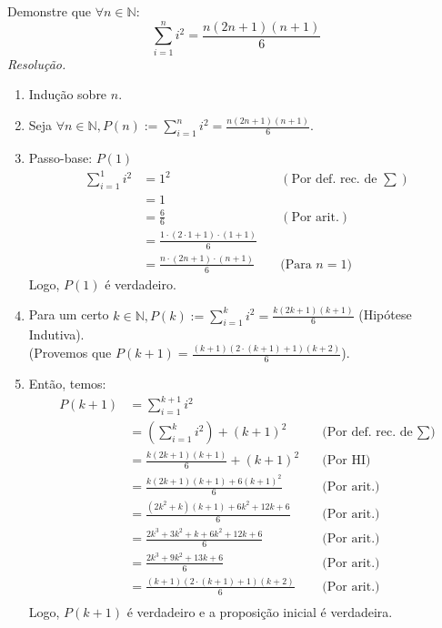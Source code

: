 Demonstre que $\forall n \in \mathbb{N}$:
\begin{displaymath}
	\sum\limits_{i=1}^n i^2 = \frac{n (2n+1) (n+1)}{6}
\end{displaymath}
\emph{Resolução.} 
\begin{enumerate}
	\item Indução sobre $n$.
	\item Seja $\forall n \in \mathbb{N}, P(n) := \sum\limits_{i=1}^n i^2 = \frac{n (2n+1) (n+1)}{6}$.
	\item Passo-base: $P(1)$
	\begin{align*}
		\sum\limits_{i=1}^1 i^2 &= 1^2 &\quad(\text{Por def. rec. de $\sum$}) \\
		&= 1 \\
		&= \frac{6}{6} &\quad(\text{Por arit.}) \\
		&= \frac{1 \cdot (2 \cdot 1 + 1) \cdot (1 + 1)}{6} \\
		&= \frac{n \cdot (2n + 1) \cdot (n + 1)}{6} &\quad \text{(Para $n = 1$)}  
	\end{align*}
	Logo, $P(1)$ é verdadeiro.
	\item Para um certo $k \in \mathbb{N}, P(k):= \sum\limits_{i=1}^k i^2 = \frac{k (2k+1) (k+1)}{6}$ (Hipótese Indutiva). \\
	(Provemos que $P(k+1) = \frac{(k+1) (2 \cdot (k+1) + 1) (k + 2)}{6}$). \\
	\item Então, temos:
	\begin{align*}
		P(k+1) &= \sum\limits_{i=1}^{k+1} i^2 \\
		&= (\sum\limits_{i=1}^{k} i^2) + (k+1)^2 &\quad \text{(Por def. rec. de $\sum$)} \\
		&= \frac{k (2k+1) (k+1)}{6} + (k+1)^2 &\quad \text{(Por HI)}\\
		&= \frac{k (2k+1) (k+1) + 6(k+1)^2}{6} &\quad \text{(Por arit.)}\\
		&= \frac{(2k^2 + k) (k+1) + 6k^2 + 12k + 6}{6} &\quad \text{(Por arit.)}\\
		&= \frac{2k^3 + 3k^2 + k + 6k^2 + 12k + 6}{6} &\quad \text{(Por arit.)}\\
		&= \frac{2k^3 + 9k^2 + 13k + 6}{6} &\quad \text{(Por arit.)}\\
		&= \frac{(k + 1) (2 \cdot (k+1) + 1) (k + 2)}{6} &\quad \text{(Por arit.)}\\
	\end{align*}
	Logo, $P(k+1)$ é verdadeiro e a proposição inicial é verdadeira.
\end{enumerate}
